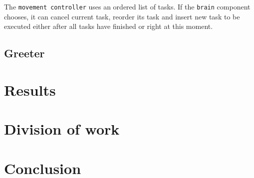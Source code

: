 \documentclass[12pt,a4paper]{article}
\begin{document}
	The \texttt{movement controller} uses an ordered list of tasks. If the \texttt{brain} component chooses, it can cancel current task, reorder its task and insert new task to be executed either after all tasks have finished or right at this moment. \\ 
	
	\subsection{Greeter}
	
	\section{Results}
	\section{Division of work}
	
	\section{Conclusion}	
	
\end{document}
